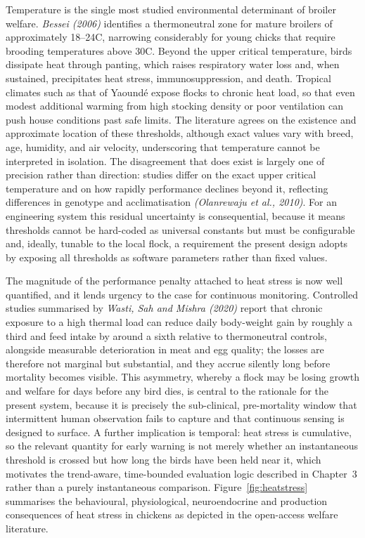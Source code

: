 \documentclass[12pt,a4paper]{report}
\begin{document}
Temperature is the single most studied environmental determinant of broiler welfare. \textit{Bessei (2006)} identifies a thermoneutral zone for mature broilers of approximately 18--24\textdegree C, narrowing considerably for young chicks that require brooding temperatures above 30\textdegree C. Beyond the upper critical temperature, birds dissipate heat through panting, which raises respiratory water loss and, when sustained, precipitates heat stress, immunosuppression, and death. Tropical climates such as that of Yaound\'e expose flocks to chronic heat load, so that even modest additional warming from high stocking density or poor ventilation can push house conditions past safe limits. The literature agrees on the existence and approximate location of these thresholds, although exact values vary with breed, age, humidity, and air velocity, underscoring that temperature cannot be interpreted in isolation. The disagreement that does exist is largely one of precision rather than direction: studies differ on the exact upper critical temperature and on how rapidly performance declines beyond it, reflecting differences in genotype and acclimatisation \textit{(Olanrewaju et al., 2010)}. For an engineering system this residual uncertainty is consequential, because it means thresholds cannot be hard-coded as universal constants but must be configurable and, ideally, tunable to the local flock, a requirement the present design adopts by exposing all thresholds as software parameters rather than fixed values.

The magnitude of the performance penalty attached to heat stress is now well quantified, and it lends urgency to the case for continuous monitoring. Controlled studies summarised by \textit{Wasti, Sah and Mishra (2020)} report that chronic exposure to a high thermal load can reduce daily body-weight gain by roughly a third and feed intake by around a sixth relative to thermoneutral controls, alongside measurable deterioration in meat and egg quality; the losses are therefore not marginal but substantial, and they accrue silently long before mortality becomes visible. This asymmetry, whereby a flock may be losing growth and welfare for days before any bird dies, is central to the rationale for the present system, because it is precisely the sub-clinical, pre-mortality window that intermittent human observation fails to capture and that continuous sensing is designed to surface. A further implication is temporal: heat stress is cumulative, so the relevant quantity for early warning is not merely whether an instantaneous threshold is crossed but how long the birds have been held near it, which motivates the trend-aware, time-bounded evaluation logic described in Chapter~3 rather than a purely instantaneous comparison. Figure~\ref{fig:heatstress} summarises the behavioural, physiological, neuroendocrine and production consequences of heat stress in chickens as depicted in the open-access welfare literature.
\end{document}
